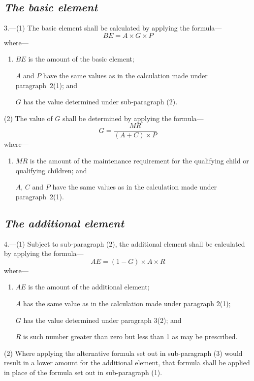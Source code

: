 \documentclass[12pt,a4paper]{article}
\begin{document}

\subsection*{\itshape The basic element}

3.---(1) The basic element shall be calculated by applying the formula—
\[
BE = A \times G \times P
\]
where—
\begin{enumerate}\item[]
    $BE$ is the amount of the basic element;

    $A$ and $P$ have the same values as in the calculation made under paragraph~2(1); and

    $G$ has the value determined under sub-paragraph (2). 
\end{enumerate}

(2) The value of $G$ shall be determined by applying the formula—
\[
G = \frac{MR}{(A + C) \times P}
\]
where—
\begin{enumerate}\item[]
    $MR$ is the amount of the maintenance requirement for the qualifying child or qualifying children; and

    $A$, $C$ and $P$ have the same values as in the calculation made under paragraph~2(1). 
\end{enumerate}


\subsection*{\itshape The additional element}

4.---(1) Subject to sub-paragraph (2), the additional element shall be calculated by applying the formula—
\[
AE = (1 - G) \times A \times R
\]
where—
\begin{enumerate}\item[]
    $AE$ is the amount of the additional element;

    $A$ has the same value as in the calculation made under paragraph 2(1);

    $G$ has the value determined under paragraph 3(2); and

    $R$ is such number greater than zero but less than 1 as may be prescribed. 
\end{enumerate}

(2) Where applying the alternative formula set out in sub-paragraph (3)  would result in a lower amount for the additional element, that formula shall be applied in place of the formula set out in sub-paragraph (1).
\end{document}
